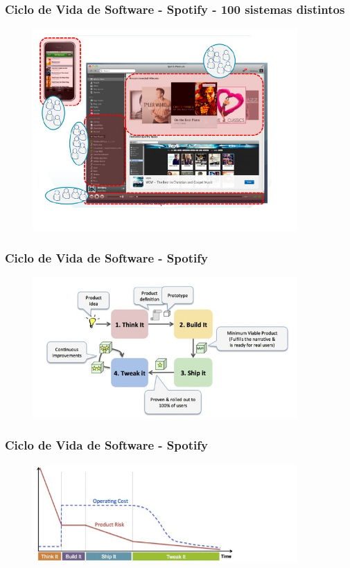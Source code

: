 \begin{frame}
 \frametitle{Ciclo de Vida de Software - Spotify -  100 sistemas distintos}
   \begin{figure}
   \centering
   \includegraphics[width = 0.9\textwidth]{figs/spot.png}
  \end{figure}	
\end{frame}


\begin{frame}
 \frametitle{Ciclo de Vida de Software - Spotify}
  \begin{figure}
   \centering
   \includegraphics[width = 0.9\textwidth]{figs/002.jpg}
  \end{figure}	
\end{frame}


\begin{frame}
 \frametitle{Ciclo de Vida de Software - Spotify}
  \begin{figure}
   \centering
   \includegraphics[width = 0.9\textwidth]{figs/004.jpg}
  \end{figure}	
\end{frame}

